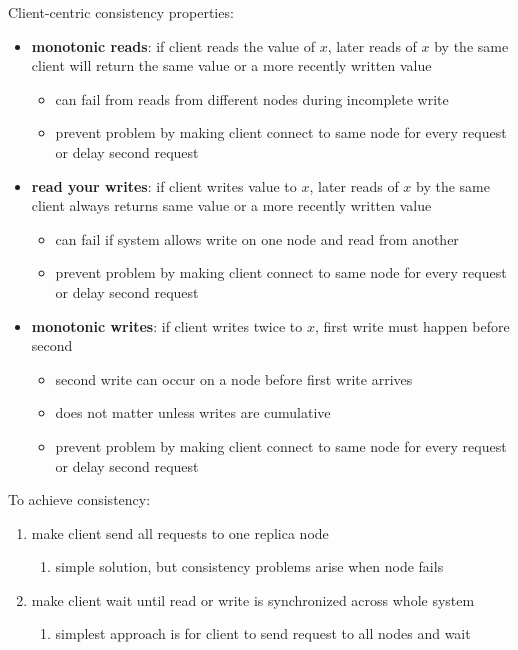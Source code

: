 \documentclass[11pt]{article}
\begin{document}
Client-centric consistency properties:
\begin{itemize}
\item \textbf{monotonic reads}: if client reads the value of \(x\), later reads of \(x\) by the same client will
return the same value or a more recently written value
\begin{itemize}
\item can fail from reads from different nodes during incomplete write
\item prevent problem by making client connect to same node for every request or delay second request
\end{itemize}
\item \textbf{read your writes}: if client writes value to \(x\), later reads of \(x\) by the same client always returns
same value or a more recently written value
\begin{itemize}
\item can fail if system allows write on one node and read from another
\item prevent problem by making client connect to same node for every request or delay second request
\end{itemize}
\item \textbf{monotonic writes}: if client writes twice to \(x\), first write must happen before second
\begin{itemize}
\item second write can occur on a node before first write arrives
\item does not matter unless writes are cumulative
\item prevent problem by making client connect to same node for every request or delay second request
\end{itemize}
\end{itemize}

To achieve consistency:
\begin{enumerate}
\item make client send all requests to one replica node
\begin{enumerate}
\item simple solution, but consistency problems arise when node fails
\end{enumerate}
\item make client wait until read or write is synchronized across whole system
\begin{enumerate}
\item simplest approach is for client to send request to all nodes and wait
\end{enumerate}
\end{enumerate}
\end{document}
